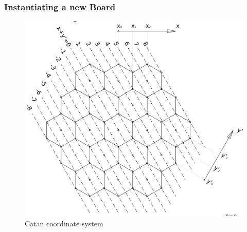 \documentclass[a4paper,doc,draftfirst]{apa6}
\begin{document}
\subsubsection{Instantiating a new Board}
\begin{figure}[hbtp]
      \includegraphics[width=\textwidth]{board}
      \caption{Catan coordinate system}
\end{figure}
\end{document}
